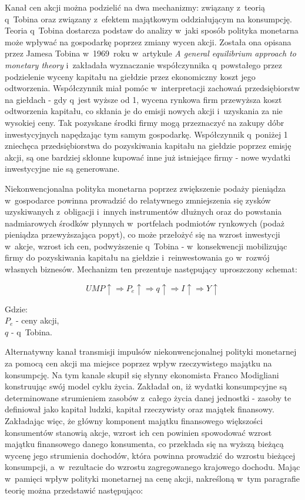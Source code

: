 Kanał cen akcji można podzielić na dwa mechanizmy: związany z~teorią q~Tobina oraz związany z~efektem majątkowym oddziałującym na konsumpcję. Teoria q~Tobina dostarcza podstaw do analizy w~jaki sposób polityka monetarna może wpływać na gospodarkę poprzez zmiany wycen akcji. Została ona opisana przez Jamesa Tobina w~1969~roku w~artykule \textit{A general equilibrium approach to monetary theory} i~zakładała wyznaczanie współczynnika q~powstałego przez podzielenie wyceny kapitału na giełdzie przez ekonomiczny koszt jego odtworzenia. Współczynnik miał pomóc w~interpretacji zachowań przedsiębiorstw na giełdach - gdy q~jest wyższe od 1, wycena rynkowa firm przewyższa koszt odtworzenia kapitału, co skłania je do emisji nowych akcji i~uzyskania za nie wysokiej ceny. Tak pozyskane środki firmy mogą przeznaczyć na zakupy dóbr inwestycyjnych napędzając tym samym gospodarkę. Współczynnik q~poniżej 1 zniechęca przedsiębiorstwa do pozyskiwania kapitału na giełdzie poprzez emisję akcji, są one bardziej skłonne kupować inne już istniejące firmy - nowe wydatki inwestycyjne nie są generowane.

Niekonwencjonalna polityka monetarna poprzez zwiększenie podaży pieniądza w~gospodarce powinna prowadzić do relatywnego zmniejszenia się zysków uzyskiwanych z~obligacji i~innych instrumentów dłużnych oraz do powstania nadmiarowych środków płynnych w~portfelach podmiotów rynkowych (podaż pieniądza przewyższająca popyt), co może przełożyć się na wzrost inwestycji w~akcje, wzrost ich cen, podwyższenie q~Tobina - w~konsekwencji mobilizując firmy do pozyskiwania kapitału na giełdzie i~reinwestowania go w~rozwój własnych biznesów. Mechanizm ten prezentuje następujący uproszczony schemat:		

\begin{equation}
UMP\uparrow \Longrightarrow P_e\uparrow \Longrightarrow q\uparrow \Longrightarrow I\uparrow \Longrightarrow Y\uparrow	
\end{equation}
\vspace{-1cm}
\begin{adjustwidth}{2.5em}{0pt}
{\footnotesize Gdzie: \\
$P_e$ - ceny akcji, \\ 
$q$ - q~Tobina.}
\end{adjustwidth}
\vspace{0.3cm}

Alternatywny kanał transmisji impulsów niekonwencjonalnej polityki monetarnej za pomocą cen akcji ma miejsce poprzez wpływ rzeczywistego majątku na konsumpcję. Na tym kanale skupił się słynny ekonomista Franco Modigliani konstruując swój model cyklu życia. Zakładał on, iż wydatki konsumpcyjne są determinowane strumieniem zasobów z~całego życia danej jednostki - zasoby te definiował jako kapitał ludzki, kapitał rzeczywisty oraz majątek finansowy. Zakładając więc, że główny komponent majątku finansowego większości konsumentów stanowią akcje, wzrost ich cen powinien spowodować wzrost majątku finansowego danego konsumenta, co przekłada się na wyższą bieżącą wycenę jego strumienia dochodów, która powinna prowadzić do wzrostu bieżącej konsumpcji, a~w~rezultacie do wzrostu zagregowanego krajowego dochodu. Mając w~pamięci wpływ polityki monetarnej na cenę akcji, nakreśloną w~tym paragrafie teorię można przedstawić następująco: 

